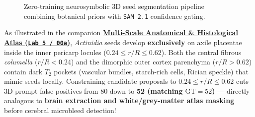 \documentclass[10.5pt,a4paper]{article}
\begin{document}
\begin{figure}[ht!]
\centering
{}
\caption{Zero-training neurosymbolic 3D seed segmentation pipeline combining botanical priors with \texttt{SAM 2.1} confidence gating.}
\end{figure}

\begin{infobox}
As illustrated in the companion \href{https://github.com/arvidl/BMED365-2027/blob/main/Lab5-Comp-Mod/Kiwi-challenge/notebooks/00a-kiwi-anatomical-and-physiological-atlas.ipynb}{\textbf{Multi-Scale Anatomical \& Histological Atlas (\texttt{Lab 5 / 00a})}}, \emph{Actinidia} seeds develop \textbf{exclusively} on axile placentae inside the inner pericarp locules ($0.24 \le r/R \le 0.62$). Both the central fibrous \emph{columella} ($r/R < 0.24$) and the dimorphic outer cortex parenchyma ($r/R > 0.62$) contain dark $T_2$ pockets (vascular bundles, starch-rich cells, Rician speckle) that mimic seeds locally. Constraining candidate proposals to $0.24 \le r/R \le 0.62$ cuts 3D prompt false positives from 80 down to \textbf{52 (matching $\text{GT} = 52$)} --- directly analogous to \textbf{brain extraction and white/grey-matter atlas masking} before cerebral microbleed detection!
\end{infobox}
\end{document}

